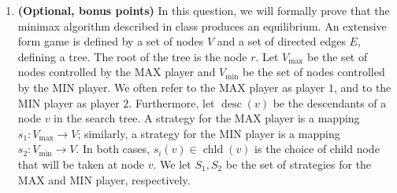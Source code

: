 \documentclass[11pt]{article}
\DeclareMathOperator{\desc}{desc}
\DeclareMathOperator{\chld}{chld}
\begin{document}
\begin{enumerate}[label=\textbf{\arabic*.}, leftmargin=*]
\begin{figure}[h]
        \caption{A minimax search tree.}
        \label{fig:minimax-tree}
    \end{figure}
\textbf{Solution:}\\
Minmax value: 9

\textbf{a)}\\
Pruned:
\[v_4 \to 0\]
\[u_1 \to v_1\]

\textbf{b)}\\
Pruned:
\[v_2 \to 3\]
\[v_2 \to 0\]









\newpage

    \item \textbf{(Optional, bonus points)} In this question, we will formally prove that the minimax algorithm described in class produces an equilibrium. An extensive form game is defined by a set of nodes $V$ and a set of directed edges $E$, defining a tree. The root of the tree is the node $r$. Let $V_{\max}$ be the set of nodes controlled by the MAX player and $V_{\min}$ be the set of nodes controlled by the MIN player. We often refer to the MAX player as player $1$, and to the MIN player as player $2$. Furthermore, let $\desc(v)$ be the descendants of a node $v$ in the search tree. A strategy for the MAX player is a mapping $s_1 : V_{\max} \to V$; similarly, a strategy for the MIN player is a mapping $s_2 : V_{\min} \to V$. In both cases, $s_i(v) \in \chld(v)$ is the choice of child node that will be taken at node $v$. We let $S_1,S_2$ be the set of strategies for the MAX and MIN player, respectively.


\end{enumerate}
\end{document}
